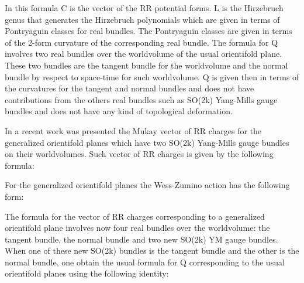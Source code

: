 \documentclass[a4paper,a4paper]{article}
\begin{document}
\begin{center}
{  \coordHE{} }
\end{center}
In this formula C is the vector of the RR potential forms. L is the Hirzebruch genus that generates the Hirzebruch polynomials which are given in
terms of Pontryaguin classes for real bundles. The Pontryaguin classes are given in terms of the 2-form curvature of the corresponding real bundle. The
formula for Q involves two real bundles over the worldvolume of the usual orientifold plane.  These two bundles are the tangent bundle for the worldvolume and the normal bundle by respect to space-time for such worldvolume. Q is given then in terms of the curvatures for the tangent and
normal bundles and does not have contributions  from the others real bundles
such as SO(2k) Yang-Mills gauge bundles and does not have any kind of topological deformation.

In a recent work was presented the Mukay vector of RR charges for the generalized orientifold planes which have two SO(2k) Yang-Mills gauge bundles on their worldvolumes.  Such vector of RR charges is given by the following formula:

\begin{center}
{  \coordHE{} }
\end{center}

For the generalized  orientifold planes the Wess-Zumino action has the following form:

\begin{center}
{  \coordHE{} }
\end{center}

The formula for the vector of RR charges corresponding to a generalized orientifold plane involves now four real bundles over the worldvolume: the 
tangent bundle, the normal bundle and two new SO(2k) YM gauge bundles.
When one of these new SO(2k) bundles is the tangent bundle and the other is the normal bundle, one obtain the usual formula for Q corresponding to the usual orientifold planes using the following identity:
\end{document}
